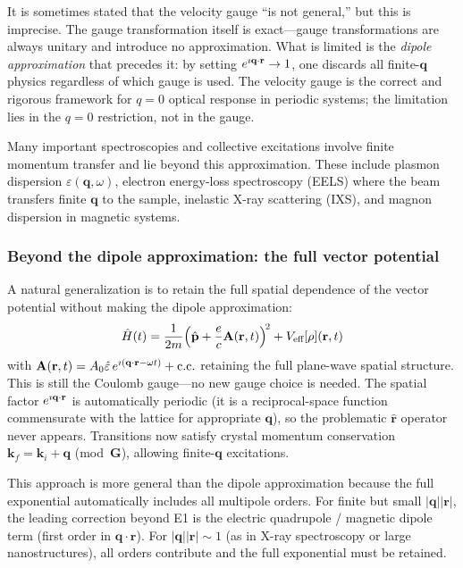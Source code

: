 It is sometimes stated that the velocity gauge ``is not general,''
but this is imprecise.  The gauge transformation itself is
exact---gauge transformations are always unitary and introduce no
approximation.  What is limited is the \emph{dipole approximation}
that precedes it: by setting $e^{\imath\mathbf{q}\cdot\mathbf{r}}
\to 1$, one discards all finite-$\mathbf{q}$ physics regardless of
which gauge is used.  The velocity gauge is the correct and rigorous
framework for $q = 0$ optical response in periodic systems; the
limitation lies in the $q = 0$ restriction, not in the gauge.

Many important spectroscopies and collective excitations involve
finite momentum transfer and lie beyond this approximation.
These include plasmon dispersion $\varepsilon(\mathbf{q},\omega)$,
electron energy-loss spectroscopy (EELS) where the beam transfers
finite $\mathbf{q}$ to the sample, inelastic X-ray scattering (IXS),
and magnon dispersion in magnetic systems.


\subsubsection{Beyond the dipole approximation: the full vector
               potential}
\label{sec:beyond-dipole}

A natural generalization is to retain the full spatial dependence of
the vector potential without making the dipole approximation:
\begin{equation}
  \hat{H}(t)
  = \frac{1}{2m}
    \!\left(\hat{\mathbf{p}} + \frac{e}{c}\mathbf{A}(\mathbf{r},t)\right)^{\!2}
  + V_\text{eff}[\rho](\mathbf{r},t)
  \label{eq:H-full-A}
\end{equation}
with $\mathbf{A}(\mathbf{r},t) = A_0\hat{\varepsilon}\,
e^{\imath(\mathbf{q}\cdot\mathbf{r}-\omega t)} + \text{c.c.}$
retaining the full plane-wave spatial structure.  This is still the
Coulomb gauge---no new gauge choice is needed.  The spatial factor
$e^{\imath\mathbf{q}\cdot\mathbf{r}}$ is automatically periodic (it
is a reciprocal-space function commensurate with the lattice for
appropriate $\mathbf{q}$), so the problematic $\hat{\mathbf{r}}$
operator never appears.  Transitions now satisfy crystal momentum
conservation $\mathbf{k}_f = \mathbf{k}_i + \mathbf{q}$
(mod~$\mathbf{G}$), allowing finite-$\mathbf{q}$ excitations.

This approach is more general than the dipole approximation because
the full exponential automatically includes all multipole orders.
For finite but small $|\mathbf{q}||\mathbf{r}|$, the leading
correction beyond E1 is the electric quadrupole / magnetic dipole
term (first order in $\mathbf{q}\cdot\mathbf{r}$).
For $|\mathbf{q}||\mathbf{r}| \sim 1$ (as in X-ray spectroscopy or
large nanostructures), all orders contribute and the full exponential
must be retained.

